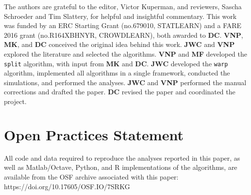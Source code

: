 \documentclass[doc,biblatex]{apa7}
\begin{document}
The authors are grateful to the editor, Victor Kuperman, and reviewers, Sascha Schroeder and Tim Slattery, for helpful and insightful commentary. This work was funded by an ERC Starting Grant (no.\@ 679010, STATLEARN) and a FARE 2016 grant (no.\@ R164XBHNYR, CROWDLEARN), both awarded to \textbf{DC}. \textbf{VNP}, \textbf{MK}, and \textbf{DC} conceived the original idea behind this work. \textbf{JWC} and \textbf{VNP} explored the literature and selected the algorithms. \textbf{VNP} and \textbf{MF} developed the \texttt{split} algorithm, with input from \textbf{MK} and \textbf{DC}. \textbf{JWC} developed the \texttt{warp} algorithm, implemented all algorithms in a single framework, conducted the simulations, and performed the analyses. \textbf{JWC} and \textbf{VNP} performed the manual corrections and drafted the paper. \textbf{DC} revised the paper and coordinated the project.

\section{Open Practices Statement}

All code and data required to reproduce the analyses reported in this paper, as well as Matlab/Octave, Python, and R implementations of the algorithms, are available from the OSF archive associated with this paper: https://doi.org/10.17605/OSF.IO/7SRKG

\printbibliography
\end{document}
